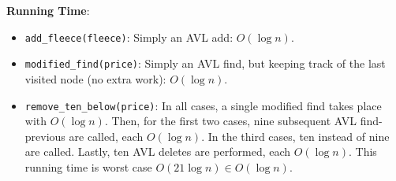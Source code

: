 \documentclass[12pt,twoside]{article}
\begin{document}
\begin{problems}
\begin{problemparts}
    \smallbreak

    {\bf Running Time}: \begin{itemize}
        \item {\tt add\_fleece(fleece)}: Simply an AVL add: $ O(\log n) $.
        \item {\tt modified\_find(price)}: Simply an AVL find, but keeping
        track of the last visited node (no extra work): $ O(\log n) $.
        \item {\tt remove\_ten\_below(price)}: In all cases, a single
        modified find takes place with $ O(\log n) $. Then, for the first two
        cases, nine subsequent AVL find-previous are called, each $ O(\log n
        ) $. In the third cases, ten instead of nine are called. Lastly, ten
        AVL deletes are performed, each $ O(\log n) $. This running time is
        worst case $ O(21 \log n) \in O(\log n) $.
    \end{itemize}


\end{problemparts}
\end{problems}
\end{document}
